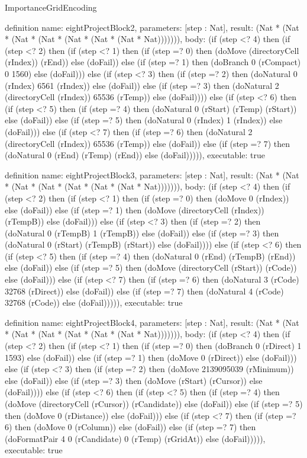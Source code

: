 \begin{lexlean}{ImportanceGridEncoding}
\begin{semanticmodule}
definition{
  name: eightProjectBlock2,
  parameters: [step : Nat],
  result: (Nat * (Nat * (Nat * (Nat * (Nat * (Nat * (Nat * Nat))))))),
  body: (if (step <? 4) then
      (if (step <? 2) then
      (if (step <? 1) then
      (if (step =? 0) then (doMove (directoryCell (rIndex)) (rEnd)) else (doFail)) else
      (if (step =? 1) then (doBranch 0 (rCompact) 0 1560) else (doFail))) else
      (if (step <? 3) then
      (if (step =? 2) then (doNatural 0 (rIndex) 6561 (rIndex)) else (doFail)) else
      (if (step =? 3) then (doNatural 2 (directoryCell (rIndex)) 65536 (rTemp)) else (doFail)))) else
      (if (step <? 6) then
      (if (step <? 5) then
      (if (step =? 4) then (doNatural 0 (rStart) (rTemp) (rStart)) else (doFail)) else
      (if (step =? 5) then (doNatural 0 (rIndex) 1 (rIndex)) else (doFail))) else
      (if (step <? 7) then
      (if (step =? 6) then (doNatural 2 (directoryCell (rIndex)) 65536 (rTemp)) else (doFail)) else
      (if (step =? 7) then (doNatural 0 (rEnd) (rTemp) (rEnd)) else (doFail))))),
  executable: true
}

definition{
  name: eightProjectBlock3,
  parameters: [step : Nat],
  result: (Nat * (Nat * (Nat * (Nat * (Nat * (Nat * (Nat * Nat))))))),
  body: (if (step <? 4) then
      (if (step <? 2) then
      (if (step <? 1) then
      (if (step =? 0) then (doMove 0 (rIndex)) else (doFail)) else
      (if (step =? 1) then (doMove (directoryCell (rIndex)) (rTempB)) else (doFail))) else
      (if (step <? 3) then
      (if (step =? 2) then (doNatural 0 (rTempB) 1 (rTempB)) else (doFail)) else
      (if (step =? 3) then (doNatural 0 (rStart) (rTempB) (rStart)) else (doFail)))) else
      (if (step <? 6) then
      (if (step <? 5) then
      (if (step =? 4) then (doNatural 0 (rEnd) (rTempB) (rEnd)) else (doFail)) else
      (if (step =? 5) then (doMove (directoryCell (rStart)) (rCode)) else (doFail))) else
      (if (step <? 7) then
      (if (step =? 6) then (doNatural 3 (rCode) 32768 (rDirect)) else (doFail)) else
      (if (step =? 7) then (doNatural 4 (rCode) 32768 (rCode)) else (doFail))))),
  executable: true
}

definition{
  name: eightProjectBlock4,
  parameters: [step : Nat],
  result: (Nat * (Nat * (Nat * (Nat * (Nat * (Nat * (Nat * Nat))))))),
  body: (if (step <? 4) then
      (if (step <? 2) then
      (if (step <? 1) then
      (if (step =? 0) then (doBranch 0 (rDirect) 1 1593) else (doFail)) else
      (if (step =? 1) then (doMove 0 (rDirect)) else (doFail))) else
      (if (step <? 3) then
      (if (step =? 2) then (doMove 2139095039 (rMinimum)) else (doFail)) else
      (if (step =? 3) then (doMove (rStart) (rCursor)) else (doFail)))) else
      (if (step <? 6) then
      (if (step <? 5) then
      (if (step =? 4) then (doMove (directoryCell (rCursor)) (rCandidate)) else (doFail)) else
      (if (step =? 5) then (doMove 0 (rDistance)) else (doFail))) else
      (if (step <? 7) then
      (if (step =? 6) then (doMove 0 (rColumn)) else (doFail)) else
      (if (step =? 7) then (doFormatPair 4 0 (rCandidate) 0 (rTemp) (rGridAt)) else (doFail))))),
  executable: true
}


\end{semanticmodule}
\end{lexlean}

